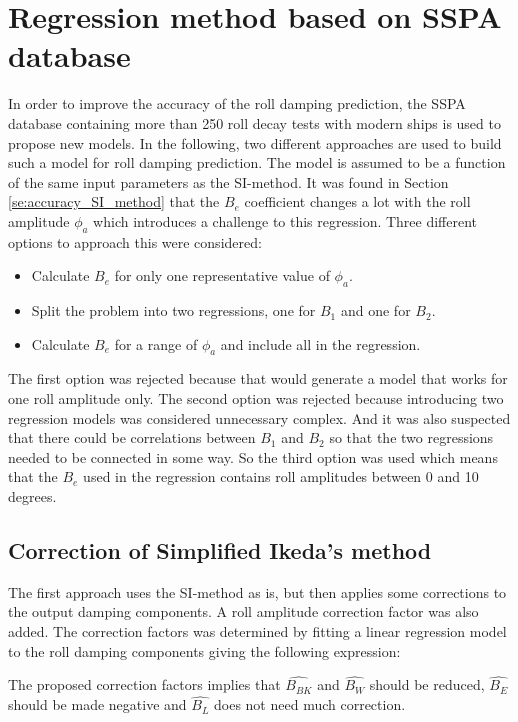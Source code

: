 \section{Regression method based on SSPA database}
\label{se:correction_SI_method}
In order to improve the accuracy of the roll damping prediction, the SSPA database containing more than 250 roll decay tests with modern ships is used to propose new models. In the following, two different approaches are used to build such a model for roll damping prediction. The model is assumed to be a function of the same input parameters as the SI-method. It was found in Section \ref{se:accuracy_SI_method} that the $B_e$ coefficient changes a lot with the roll amplitude $\phi_a$ which introduces a challenge to this regression. Three different options to approach this were considered:
\begin{itemize}
    \item Calculate $B_e$ for only one representative value of $\phi_a$.
    \item Split the problem into two regressions, one for $B_1$ and one for $B_2$.
    \item Calculate $B_e$ for a range of $\phi_a$ and include all in the regression.
\end{itemize}
The first option was rejected because that would generate a model that works for one roll amplitude only. The second option was rejected because introducing two regression models was considered unnecessary complex. And it was also suspected that there could be correlations between $B_1$ and $B_2$ so that the two regressions needed to be connected in some way. So the third option was used which means that the $B_e$ used in the regression contains roll amplitudes between 0 and 10 degrees.  

\subsection{Correction of Simplified Ikeda's method}
The first approach uses the SI-method as is, but then applies some corrections to the output damping components. A roll amplitude correction factor was also added. The correction factors was determined by fitting a linear regression model to the roll damping components giving the following expression: 

The proposed correction factors implies that $\hat{B_{BK}}$ and $\hat{B_{W}}$ should be reduced, $\hat{B_{E}}$ should be made negative and $\hat{B_{L}}$ does not need much correction.


